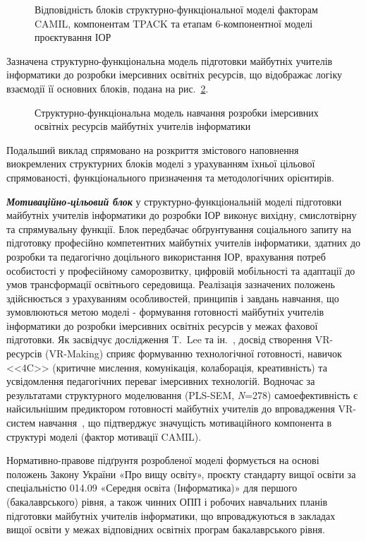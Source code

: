 \begin{figure}[!h]
\centering

\caption{Відповідність блоків структурно-функціональної моделі факторам CAMIL, компонентам TPACK та етапам 6-компонентної моделі проєктування ІОР}
\label{fig:model_alignment}
\end{figure}

Зазначена структурно-функціональна модель підготовки майбутніх учителів інформатики до розробки імерсивних освітніх ресурсів, що відображає логіку взаємодії її основних блоків, подана на рис.~\ref{fig:2.3}.

\begin{figure}[!h]
\centering

\caption{Структурно-функціональна модель навчання розробки імерсивних освітніх ресурсів майбутніх учителів інформатики}
\label{fig:2.3}
\end{figure}

Подальший виклад спрямовано на розкриття змістового наповнення виокремлених структурних блоків моделі з урахуванням їхньої цільової спрямованості, функціонального призначення та методологічних орієнтирів.

\emph{\textbf{Мотиваційно-цільовий блок}} у структурно-функціональній моделі підготовки майбутніх учителів інформатики до розробки ІОР виконує вихідну, смислотвірну та спрямувальну функції. Блок передбачає обґрунтування соціального запиту на підготовку професійно компетентних майбутніх учителів інформатики, здатних до розробки та педагогічно доцільного використання ІОР, врахування потреб особистості у професійному саморозвитку, цифровій мобільності та адаптації до умов трансформації освітнього середовища. Реалізація зазначених положень здійснюється з урахуванням особливостей, принципів і завдань навчання, що зумовлюються метою моделі - формування готовності майбутніх учителів інформатики до розробки імерсивних освітніх ресурсів у межах фахової підготовки. Як засвідчує дослідження T.~Lee та ін.~\cite{Lee2022VRMaking}, досвід створення VR-ресурсів (VR-Making) сприяє формуванню технологічної готовності, навичок <<4C>> (критичне мислення, комунікація, колаборація, креативність) та усвідомлення педагогічних переваг імерсивних технологій. Водночас за результатами структурного моделювання (PLS-SEM, \textit{N}=278) самоефективність є найсильнішим предиктором готовності майбутніх учителів до впровадження VR-систем навчання~\cite{Xie2024UTAUT2VR}, що підтверджує значущість мотиваційного компонента в структурі моделі (фактор мотивації CAMIL).

Нормативно-правове підґрунтя розробленої моделі формується на основі положень Закону України «Про вищу освіту», проєкту стандарту вищої освіти за спеціальністю 014.09 «Середня освіта (Інформатика)» для першого (бакалаврського) рівня, а також чинних ОПП і робочих навчальних планів підготовки майбутніх учителів інформатики, що впроваджуються в закладах вищої освіти у межах відповідних освітніх програм бакалаврського рівня.

